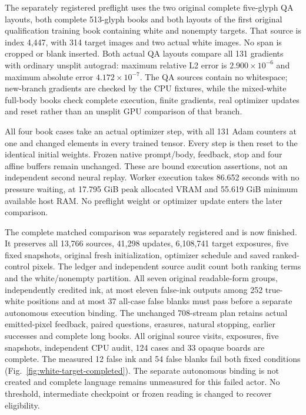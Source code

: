 The separately registered preflight uses the two original complete five-glyph
QA layouts, both complete 513-glyph books and both layouts of the first original
qualification training book containing white and nonempty targets. That source
is index 4,447, with 314 target images and two actual white images. No span is
cropped or blank inserted. Both actual QA layouts compare all 131 gradients
with ordinary unsplit autograd: maximum relative L2 error is
$2.900\times10^{-6}$ and maximum absolute error $4.172\times10^{-7}$.
The QA sources contain no whitespace; new-branch gradients are checked by the
CPU fixtures, while the mixed-white full-body books check complete execution,
finite gradients, real optimizer updates and reset rather than an unsplit GPU
comparison of that branch.

All four book cases take an actual optimizer step, with all 131 Adam counters
at one and changed elements in every trained tensor. Every step is then reset
to the identical initial weights. Frozen native prompt/body, feedback, stop
and four affine buffers remain unchanged. These are bound execution assertions,
not an independent second neural replay. Worker execution takes 86.652 seconds
with no pressure waiting, at 17.795 GiB peak allocated VRAM and 55.619 GiB
minimum available host RAM. No preflight weight or optimizer update enters
the later comparison.

The complete matched comparison was separately registered and is now finished.
It preserves all 13,766 sources, 41,298 updates, 6,108,741 target exposures,
five fixed snapshots, original fresh initialization, optimizer schedule and
saved ranked-control pixels. The ledger and independent source audit count
both ranking terms and the white/nonempty partition. All seven original
readable-form groups, independently credited ink, at most eleven false-ink
outputs among 252 true-white positions and at most 37 all-case false blanks
must pass before a separate autonomous execution binding. The unchanged
708-stream plan retains actual emitted-pixel feedback, paired questions,
erasures, natural stopping, earlier successes and complete long books.
All original source visits, exposures, five snapshots, independent CPU audit,
124 cases and 33 opaque boards are complete. The measured 12 false ink and
54 false blanks fail both fixed conditions (Fig.~\ref{fig:white-target-completed}).
The separate autonomous binding is not created and complete language remains
unmeasured for this failed actor. No threshold, intermediate checkpoint or frozen
reading is changed to recover eligibility.
